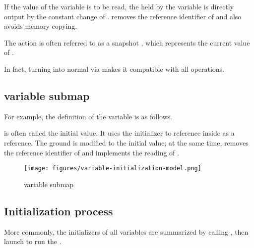\begin{content}
If the value of the variable is to be read, the  held by the variable is directly output by the constant change of .  removes the reference identifier of  and also avoids memory copying.

The  action  is often referred to as a snapshot , which represents the current value of .

In fact, turning  into normal  via  makes it compatible with all  operations.


\subsection{variable submap}

For example, the definition of the variable  is as follows.


 is often called the initial value. It uses the initializer  to reference  inside  as a reference. The ground is modified to the initial value; at the same time,  removes the reference identifier of  and implements the reading of .

\begin{figure}[!h]
\centering
\texttt{[image: figures/variable-initialization-model.png]}
\caption{variable submap}
 \label{fig:variable-initialization-model}
\end{figure}


\subsection{Initialization process}

More commonly, the initializers of all variables are summarized by calling , then launch  to run the .



\end{content}
